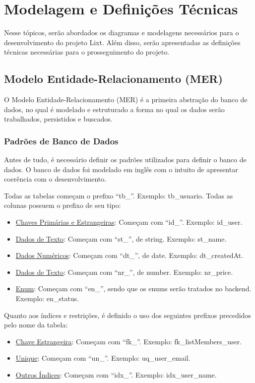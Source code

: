 \section{Modelagem e Definições Técnicas}

Nesse tópicos, serão abordados os diagramas e modelagens necessários para o desenvolvimento do projeto Lixt. Além disso, serão apresentadas as definições técnicas necessárias para o prosseguimento do projeto.

\subsection{Modelo Entidade-Relacionamento (MER)}

O Modelo Entidade-Relacionamento (MER) é a primeira abstração do banco de dados, no qual é modelado e estruturado a forma no qual os dados serão trabalhados, persistidos e buscados.

\subsubsection{Padrões de Banco de Dados}

Antes de tudo, é necessário definir os padrões utilizados para definir o banco de dados. O banco de dados foi modelado em inglês com o intuito de apresentar coerência com o desenvolvimento.

Todas as tabelas começam o prefixo ``tb\_''. Exemplo: tb\_usuario. Todas as colunas possuem o prefixo de seu tipo:

\begin{itemize}
	\item \underline{Chaves Primárias e Estrangeiras}: Começam com ``id\_''. Exemplo: id\_user.
	\item \underline{Dados de Texto}: Começam com ``st\_'', de string. Exemplo: st\_name.
	\item \underline{Dados Numéricos}: Começam com ``dt\_'', de date. Exemplo: dt\_createdAt.
	\item \underline{Dados de Texto}: Começam com ``nr\_'', de number. Exemplo: nr\_price.  
	\item \underline{Enum}: Começam com ``en\_'', sendo que os enums serão tratados no backend. Exemplo: en\_status.  
\end{itemize}

Quanto aos índices e restrições, é definido o uso dos seguintes prefixos precedidos pelo nome da tabela:

\begin{itemize}
	\item \underline{Chave Estrangeira}: Começam com ``fk\_''. Exemplo: fk\_listMembers\_user. 
	\item \underline{Unique}: Começam com ``un\_''. Exemplo: uq\_user\_email.
	\item \underline{Outros Índices}: Começam com ``idx\_''. Exemplo: idx\_user\_name. 
\end{itemize}


